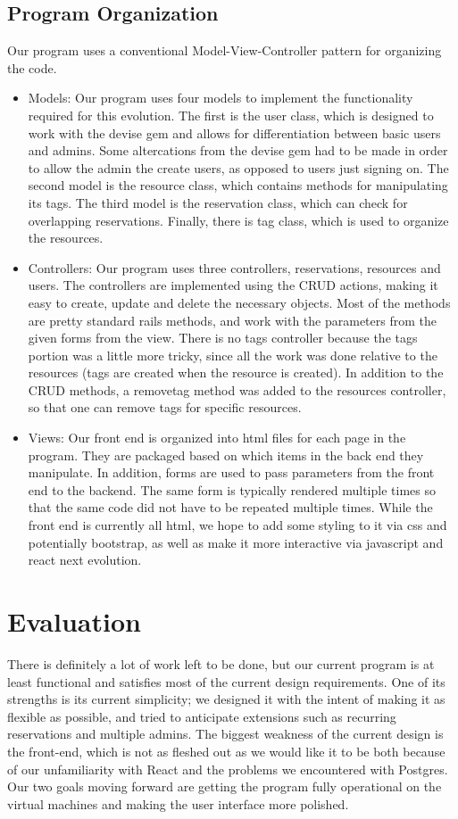 \documentclass{article}
\begin{document}
\subsection{Program Organization}
Our program uses a conventional Model-View-Controller pattern for organizing the code.
\begin{itemize}
\item{Models: Our program uses four models to implement the functionality required for this evolution.  The first is the user class, which is designed to work with the devise gem and allows for differentiation between basic users and admins.  Some altercations from the devise gem had to be made in order to allow the admin the create users, as opposed to users just signing on. The second model is the resource class, which contains methods for manipulating its tags.  The third model is the reservation class, which can check for overlapping reservations.  Finally, there is tag class, which is used to organize the resources.}
\item{Controllers: Our program uses three controllers, reservations, resources and users. The controllers are implemented using the CRUD actions, making it easy to create, update and delete the necessary objects. Most of the methods are pretty standard rails methods, and work with the parameters from the given forms from the view. There is no tags controller because the tags portion was a little more tricky, since all the work was done relative to the resources (tags are created when the resource is created). In addition to the CRUD methods, a removetag method was added to the resources controller, so that one can remove tags for specific resources.}
\item{Views: Our front end is organized into html files for each page in the program.  They are packaged based on which items in the back end they manipulate. In addition, forms are used to pass parameters from the front end to the backend. The same form is typically rendered multiple times so that the same code did not have to be repeated multiple times. While the front end is currently all html, we hope to add some styling to it via css and potentially bootstrap, as well as make it more interactive via javascript and react next evolution. }
\end{itemize}
\section{Evaluation}
There is definitely a lot of work left to be done, but our current program is at least functional and satisfies most of the current design requirements.  One of its strengths is its current simplicity; we designed it with the intent of making it as flexible as possible, and tried to anticipate extensions such as recurring reservations and multiple admins.  The biggest weakness of the current design is the front-end, which is not as fleshed out as we would like it to be both because of our unfamiliarity with React and the problems we encountered with Postgres.  Our two goals moving forward are getting the program fully operational on the virtual machines and making the user interface more polished.
\end{document}
